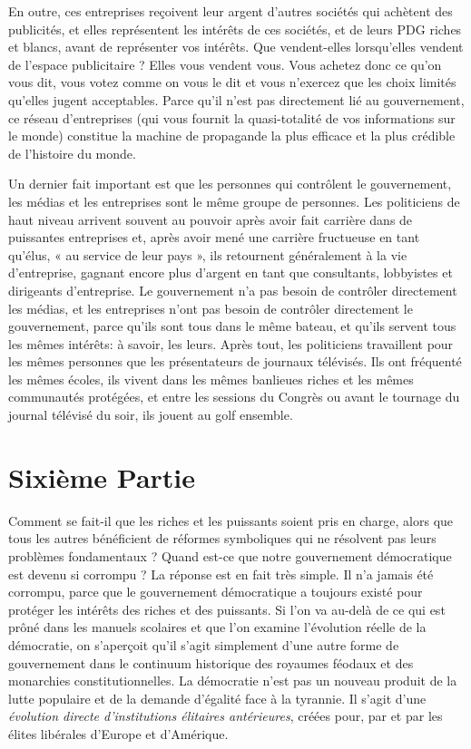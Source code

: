 En outre, ces entreprises reçoivent leur argent d'autres sociétés qui achètent des publicités, et elles représentent les intérêts de ces sociétés, et de leurs PDG riches et blancs, avant de représenter vos intérêts. Que vendent-elles lorsqu'elles vendent de l'espace publicitaire ? Elles vous vendent vous. Vous achetez donc ce qu'on vous dit, vous votez comme on vous le dit et vous n'exercez que les choix limités qu'elles jugent acceptables. Parce qu'il n'est pas directement lié au gouvernement, ce réseau d'entreprises (qui vous fournit la quasi-totalité de vos informations sur le monde) constitue la machine de propagande la plus efficace et la plus crédible de l'histoire du monde.

Un dernier fait important est que les personnes qui contrôlent le gouvernement, les médias et les entreprises sont le même groupe de personnes. Les politiciens de haut niveau arrivent souvent au pouvoir après avoir fait carrière dans de puissantes entreprises et, après avoir mené une carrière fructueuse en tant qu'élus, « au service de leur pays », ils retournent généralement à la vie d'entreprise, gagnant encore plus d'argent en tant que consultants, lobbyistes et dirigeants d'entreprise. Le gouvernement n'a pas besoin de contrôler directement les médias, et les entreprises n'ont pas besoin de contrôler directement le gouvernement, parce qu'ils sont tous dans le même bateau, et qu'ils servent tous les mêmes intérêts: à savoir, les leurs. Après tout, les politiciens travaillent pour les mêmes personnes que les présentateurs de journaux télévisés. Ils ont fréquenté les mêmes écoles, ils vivent dans les mêmes banlieues riches et les mêmes communautés protégées, et entre les sessions du Congrès ou avant le tournage du journal télévisé du soir, ils jouent au golf ensemble.

\chapter*{\textbf{Sixième Partie}}

Comment se fait-il que les riches et les puissants soient pris en charge, alors que tous les autres bénéficient de réformes symboliques qui ne résolvent pas leurs problèmes fondamentaux ? Quand est-ce que notre gouvernement démocratique est devenu si corrompu ? La réponse est en fait très simple. Il n'a jamais été corrompu, parce que le gouvernement démocratique a toujours existé pour protéger les intérêts des riches et des puissants. Si l'on va au-delà de ce qui est prôné dans les manuels scolaires et que l'on examine l'évolution réelle de la démocratie, on s'aperçoit qu'il s'agit simplement d'une autre forme de gouvernement dans le continuum historique des royaumes féodaux et des monarchies constitutionnelles. La démocratie n'est pas un nouveau produit de la lutte populaire et de la demande d'égalité face à la tyrannie. Il s'agit d'une \emph{évolution directe d'institutions élitaires antérieures}, créées pour, par et par les élites libérales d'Europe et d'Amérique.

